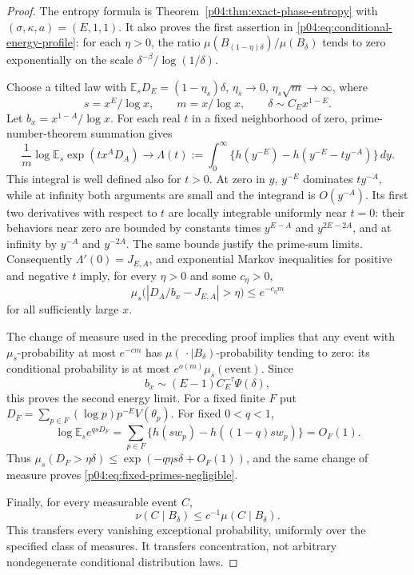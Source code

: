 \documentclass[11pt,letterpaper]{article}
\theoremstyle{definition}
\theoremstyle{remark}
\newcommand{\1}{\mathbf 1}
\begin{document}
\begin{proof}
The entropy formula is Theorem~\ref{p04:thm:exact-phase-entropy} with
$(\sigma,\kappa,a)=(E,1,1)$. It also proves the first assertion
in \eqref{p04:eq:conditional-energy-profile}: for each $\eta>0$, the
ratio $\mu(B_{(1-\eta)\delta})/\mu(B_\delta)$ tends to zero
exponentially on the scale $\delta^{-\beta}/\log(1/\delta)$.

Choose a tilted law with $\mathbb E_s D_E=(1-\eta_s)\delta$,
$\eta_s\to0$, $\eta_s\sqrt m\to\infty$, where
\[
 s=x^E/\log x,\qquad m=x/\log x,\qquad
 \delta\sim C_Ex^{1-E}.
\]
Let $b_x=x^{1-A}/\log x$. For each real $t$ in a fixed
neighborhood of zero, prime-number-theorem summation gives
\begin{equation}\label{p04:eq:cross-energy-log-mgf}
 \frac1m\log\mathbb E_s\exp(t x^A D_A)
 \longrightarrow
 \Lambda(t):=\int_0^\infty
 \{h(y^{-E})-h(y^{-E}-ty^{-A})\}\,dy.
\end{equation}
This integral is well defined also for $t>0$. At zero in $y$,
$y^{-E}$ dominates $ty^{-A}$, while at infinity both arguments
are small and the integrand is $O(y^{-A})$. Its first two
derivatives with respect to $t$ are locally integrable uniformly
near $t=0$: their behaviors near zero are bounded by constants
times $y^{E-A}$ and $y^{2E-2A}$, and at infinity by $y^{-A}$
and $y^{-2A}$. The same bounds justify the prime-sum limits.
Consequently $\Lambda'(0)=J_{E,A}$, and exponential Markov
inequalities for positive and negative $t$ imply, for every
$\eta>0$ and some $c_\eta>0$,
\[
 \mu_s\bigl(|D_A/b_x-J_{E,A}|>\eta\bigr)
 \le e^{-c_\eta m}
\]
for all sufficiently large $x$.

The change of measure used in the preceding proof implies that
any event with $\mu_s$-probability at most $e^{-cm}$ has
$\mu(\,\cdot\mid B_\delta)$-probability tending to zero: its
conditional probability is at most $e^{o(m)}\mu_s(\text{event})$.
Since
\[
 b_x\sim(E-1)C_E^{-\tau}\Psi(\delta),
\]
this proves the second energy limit. For a fixed finite $F$ put
$D_F=\sum_{p\in F}(\log p)p^{-E}V(\theta_p)$.
For fixed $0<q<1$,
\[
 \log\mathbb E_s e^{qsD_F}
 =\sum_{p\in F}\{h(sw_p)-h((1-q)sw_p)\}=O_F(1).
\]
Thus $\mu_s(D_F>\eta\delta)\le\exp(-q\eta s\delta+O_F(1))$,
and the same change of measure proves
\eqref{p04:eq:fixed-primes-negligible}.

Finally, for every measurable event $C$,
\[
 \nu(C\mid B_\delta)
 \le c^{-1}\mu(C\mid B_\delta).
\]
This transfers every vanishing exceptional probability, uniformly
over the specified class of measures. It transfers concentration,
not arbitrary nondegenerate conditional distribution laws.
\end{proof}
\end{document}
